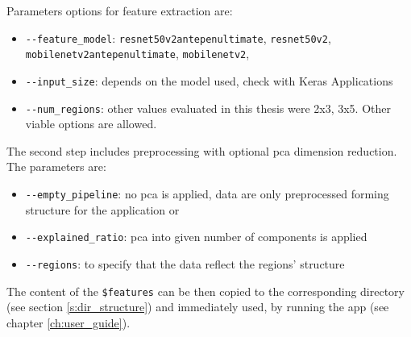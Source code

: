 \vspace{0.5cm}

\vspace{0.5cm}

Parameters options for feature extraction are:
\begin{itemize}
    \item \verb+--feature_model+: \verb+resnet50v2antepenultimate+, \verb+resnet50v2+, \\ \verb+mobilenetv2antepenultimate+, \verb+mobilenetv2+, 
    \item \verb+--input_size+: depends on the model used, check with Keras Applications
    \item \verb+--num_regions+: other values evaluated in this thesis were 2x3, 3x5. Other viable options are allowed.
\end{itemize}

The second step includes preprocessing with optional \acrshort{pca} dimension reduction. The parameters are:
\begin{itemize}
    \item \verb+--empty_pipeline+: no \acrshort{pca} is applied, data are only preprocessed forming structure for the application or
    \item \verb+--explained_ratio+: \acrshort{pca} into given number of components is applied
    \item \verb+--regions+: to specify that the data reflect the regions' structure
\end{itemize}

The content of the \verb+$features+ can be then copied to the corresponding directory (see section \ref{s:dir_structure}) and immediately used, by running the app (see chapter \ref{ch:user_guide}).

